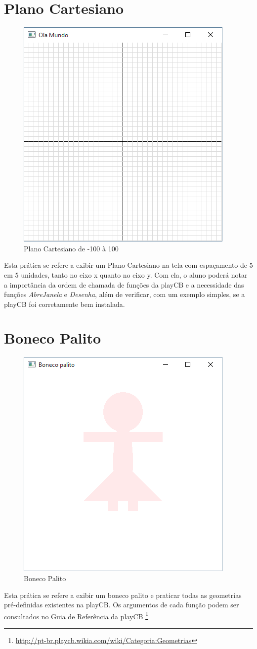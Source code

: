 \section{Plano Cartesiano}
\begin{figure}[ht]
  \centerline{\includegraphics[width=.5\textwidth]{img/cap1_ex1.png}}
  \caption{Plano Cartesiano de -100 à 100}
  \label{fig:cap01_ex1}
\end{figure}
Esta prática se refere a exibir um Plano Cartesiano na tela com espaçamento de 5 em 5 unidades, tanto no eixo x quanto no eixo y. Com ela, o aluno poderá notar a importância da ordem de chamada de funções da playCB e a necessidade das funções \emph{AbreJanela} e \emph{Desenha}, além de verificar, com um exemplo simples, se a playCB foi corretamente bem instalada.


\section{Boneco Palito}
\begin{figure}[ht]
  \centerline{\includegraphics[width=.5\textwidth]{img/cap1_ex3.png}}
  \caption{Boneco Palito}
  \label{fig:cap01_ex2}
\end{figure}
Esta prática se refere a exibir um boneco palito e praticar todas as geometrias pré-definidas existentes na playCB. Os argumentos de cada função podem ser consultados no Guia de Referência da playCB \footnote{\url{http://pt-br.playcb.wikia.com/wiki/Categoria:Geometrias}}


